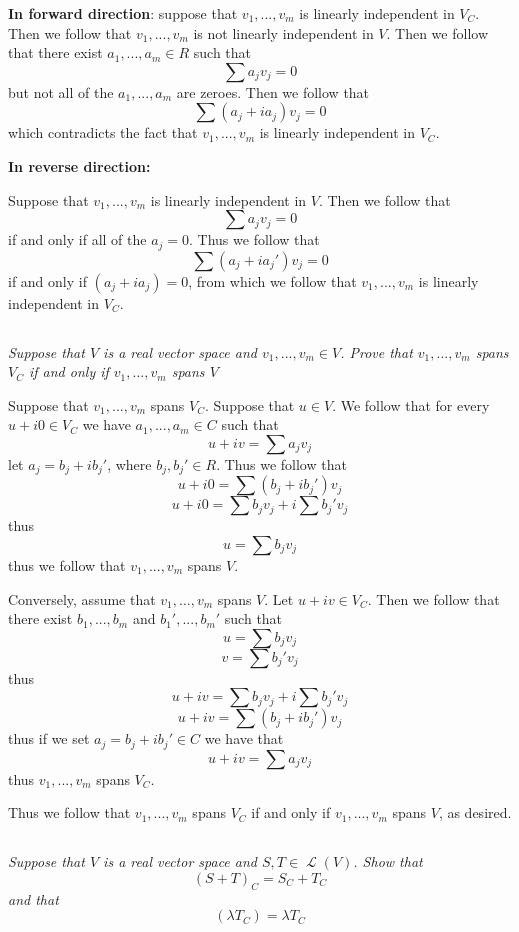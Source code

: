 \documentclass[11pt,oneside,titlepage]{book}
\DeclareMathOperator \map {\mathcal {L}}
\begin{document}
\textbf{In forward direction}:
suppose that $v_1, ..., v_m$ is linearly independent in $V_C$. Then we follow that
$v_1, ..., v_m$ is not linearly independent in $V$. Then we follow that there exist
$a_1, ..., a_m \in R$ such that
$$\sum {a_j v_j} = 0$$
but not all of the $a_1, ..., a_m$ are zeroes. Then we follow that
$$\sum {(a_j + ia_j) v_j} = 0$$
which contradicts the fact that $v_1, ..., v_m$ is linearly independent in $V_C$.

\textbf{In reverse direction: }

Suppose that $v_1, ..., v_m$ is linearly independent in $V$. Then we follow that
$$\sum{a_j v_j} = 0$$
if and only if all of the $a_j = 0$. Thus we follow that
$$\sum{(a_j + ia_j') v_j}  = 0$$
if and only if $(a_j + ia_j) = 0$, from which we follow that
$v_1, ..., v_m$ is linearly independent in $V_C$.


\subsection{}

\textit{Suppose that $V$ is a real vector space and $v_1, ..., v_m \in V$. Prove that
  $v_1, ..., v_m$ spans $V_C$ if and only if $v_1, ..., v_m$ spans $V$}

Suppose that $v_1, ..., v_m$ spans $V_C$. Suppose that $u \in V$. We follow
that for every $u + i0 \in V_C$
we have $a_1, ..., a_m \in C$ such that
$$u + iv = \sum {a_j v_j}$$
let $a_j = b_j + i b_j'$, where $b_j, b_j' \in R$. Thus we follow that
$$u + i0 = \sum {(b_j + ib_j') v_j}$$
$$u + i0 = \sum {b_jv_j} + i \sum{b_j' v_j}$$
thus 
$$u = \sum {b_j v_j}$$
thus we follow that $v_1, ..., v_m$ spans $V$.

Conversely, assume that $v_1, ..., v_m$ spans $V$. Let $u + iv \in V_C$. Then we follow that
there exist $b_1, ..., b_m$ and $b_1', ..., b_m'$ such that
$$u = \sum {b_j v_j}$$
$$v = \sum {b_j' v_j}$$
thus
$$u + iv = \sum {b_j v_j} + i\sum {b_j' v_j}$$
$$u + iv = \sum {(b_j + ib_j') v_j}$$
thus if we set $a_j = b_j + ib_j' \in C$ we have that
$$u + iv = \sum{a_j v_j}$$
thus $v_1, ..., v_m$ spans $V_C$.

Thus we follow that $v_1, ..., v_m$ spans $V_C$ if and only if $v_1, ..., v_m$ spans $V$, as desired.


\subsection{}

\textit{Suppose that $V$ is a real vector space and $S, T \in \map(V)$. Show that
  $$(S + T)_C = S_C + T_C$$
  and that
  $$(\lambda T_C) = \lambda T_C$$
}
\end{document}
